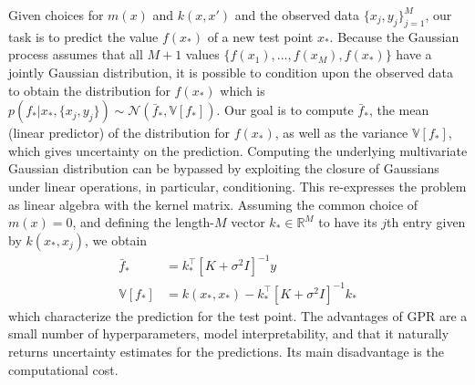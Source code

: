 \begin{refsection}
Given choices for $m(x)$ and $k(x,x')$ and the observed data $\{x_j,y_j\}_{j=1}^M$, our task is to predict the value $f(x_*)$ of a new test point $x_*$. Because the Gaussian process assumes that all $M+1$ values $\{f(x_1),\ldots,f(x_M), f(x_*)\}$ have a jointly Gaussian distribution, it is possible to condition upon the observed data to obtain the distribution for $f(x_*)$ which is $p(f_* | x_*, \{x_j,y_j\}) \sim \mathcal{N}\left(\bar{f}_* , \mathbb{V}[f_*] \right)$. Our goal is to compute $\bar{f}_*$, the mean (linear predictor) of the distribution for $f(x_*)$, as well as the variance $\mathbb{V}[f_*]$, which gives uncertainty on the prediction. Computing the underlying multivariate Gaussian distribution can be bypassed by exploiting the closure of Gaussians under linear operations, in particular, conditioning. 
This re-expresses the problem as linear algebra with the kernel matrix. Assuming the common choice of $m(x) =0$, and defining the length-$M$ vector $k_* \in \mathbb{R}^M$ to have its $j$th entry given by $k(x_*, x_j)$, we obtain 
\begin{align}
    \bar{f}_* &= k_*^\intercal [K + \sigma^2 I]^{-1} y \\
    \mathbb{V}[f_*] &= k(x_*, x_*) - k_*^\intercal [K + \sigma^2 I]^{-1} k_*
\end{align} 
which characterize the prediction for the test point.
The advantages of GPR are a small number of hyperparameters, model interpretability, and that it naturally returns uncertainty estimates for the predictions. Its main disadvantage is the computational cost. 



\end{refsection}

